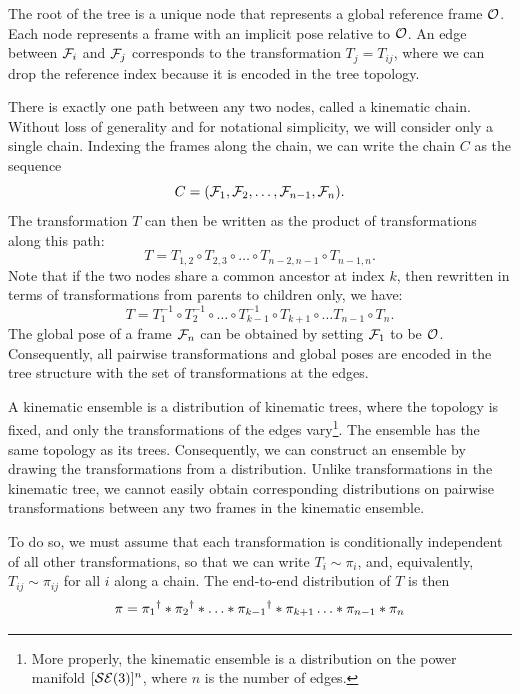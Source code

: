 \documentclass[../../main.tex]{subfiles}
\begin{document}
\begin{refsection}
	The root of the tree is a unique node that represents a global reference frame $\mathcal{O}$.
	Each node represents a frame with an implicit pose relative to $\mathcal{O}$.
	An edge between $\mathcal{F}_i$ and $\mathcal{F}_j$ corresponds to the transformation $T_j = T_{ij}$, where we can drop the reference index because it is encoded in the tree topology.

	There is exactly one path between any two nodes, called a kinematic chain.
	Without loss of generality and for notational simplicity, we will consider only a single chain.
	Indexing the frames along the chain, we can write the chain $C$ as the sequence
	$$C = (\mathcal{F}_1, \mathcal{F}_2, \ldots, \mathcal{F}_{n-1}, \mathcal{F}_n).$$
	The transformation $T$ can then be written as the product of transformations along this path:
	$$T = T_{1,2} \circ T_{2,3} \circ \ldots \circ T_{n-2,n-1} \circ T_{n-1,n}.$$
	Note that if the two nodes share a common ancestor at index $k$, then rewritten in terms of transformations from parents to children only, we have:
	$$T = T_{1}^{-1} \circ T_{2}^{-1} \circ \ldots \circ T_{k-1}^{-1} \circ T_{k+1} \circ \ldots T_{n-1} \circ T_{n}.$$
	The global pose of a frame $\mathcal{F}_{n}$ can be obtained by setting $\mathcal{F}_1$ to be $\mathcal{O}$.
	Consequently, all pairwise transformations and global poses are encoded in the tree structure with the set of transformations at the edges.

	A kinematic ensemble is a distribution of kinematic trees, where the topology is fixed, and only the transformations of the edges vary\footnote{
		More properly, the kinematic ensemble is a distribution on the power manifold $[\mathcal{SE} (3)]^n$, where $n$ is the number of edges.
	}.
	The ensemble has the same topology as its trees.
	Consequently, we can construct an ensemble by drawing the transformations from a distribution.
	Unlike transformations in the kinematic tree, we cannot easily obtain corresponding distributions on pairwise transformations between any two frames in the kinematic ensemble.

	To do so, we must assume that each transformation is conditionally independent of all other transformations, so that we can write $T_i \sim \pi_i$, and, equivalently, $T_{ij} \sim \pi_{ij}$ for all $i$ along a chain.
	The end-to-end distribution of $T$ is then
	$$
		\pi = {\pi_1}^{\dagger} * {\pi_2}^{\dagger} *
		\ldots * {\pi_{k-1}}^{\dagger} * \pi_{k+1}
		\ldots * \pi_{n-1} * \pi_{n}
	$$


\end{refsection}
\end{document}
